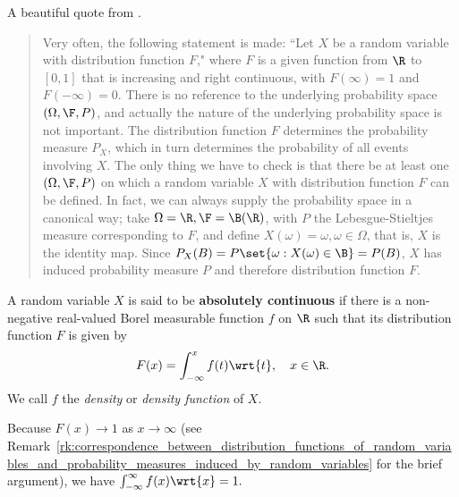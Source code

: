 \documentclass{article} %
\begin{document}
\begin{remark}{} 

A beautiful quote from \cite[pp.174]{ash2000probability}.

\begin{quotation}
Very often, the following statement is made: ``Let $X$ be a random variable with distribution function $F$," where $F$ is a given function from $\R$ to $[0,1]$ that is increasing and right continuous, with $F(\infty)=1$ and $F(-\infty)=0$.  There is no reference to the underlying probability space $(\Omega, \F, P)$, and actually the nature of the underlying probability space is not important.  The distribution function $F$ determines the probability measure $P_X$, which in turn determines the probability of all events involving $X$.  The only thing we have to check is that there be at least one $(\Omega, \F, P)$ on which a random variable $X$ with distribution function $F$ can be defined.  In fact, we can always supply the probability space in a canonical way; take $\Omega = \R, \F = \B(\R)$, with $P$ the Lebesgue-Stieltjes measure corresponding to $F$, and define $X(\omega) = \omega, \omega \in \Omega$, that is, $X$ is the identity map.   Since $P_X(B) = P\set{\omega: X(\omega) \in \B}=P(B)$, $X$ has induced probability measure $P$ and therefore distribution function $F$.
\end{quotation}
\label{rk:canonical_underlying_probability_space_for_a_random_variable}
\end{remark}

\begin{definition}{}
A random variable $X$ is said to be \textbf{absolutely continuous} if there is a non-negative real-valued Borel measurable function $f$ on $\R$ such that its distribution function $F$ is given by
\[ F(x) = \int_{-\infty}^x f(t) \wrt{t}, \quad x \in \R.\]
We call $f$ the \textit{density} or \textit{density function} of $X$. 
\label{def:absolutely_continuous_random_variable}
\end{definition}

\begin{remark}
Because $F(x) \to 1$ as $x \to \infty$ (see Remark~\ref{rk:correspondence_between_distribution_functions_of_random_variables_and_probability_measures_induced_by_random_variables} for the brief argument), we have 
$\int_{-\infty}^\infty f(x) \wrt{x} = 1.$ 	
\end{remark}
\end{document}
